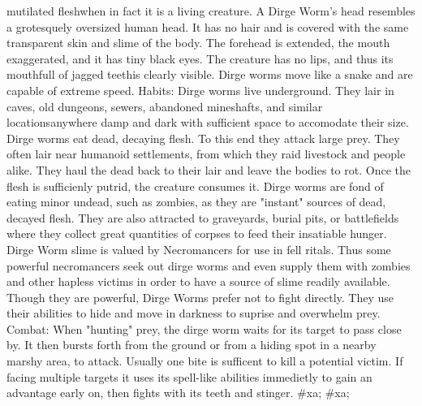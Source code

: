 \documentclass[twoside]{book}
\begin{document}
\begin{multicols}{2}
{           mutilated fleshwhen in fact it is a living creature. A
           Dirge Worm's head resembles a grotesquely oversized human
           head. It has no hair and is covered with the same transparent
           skin and slime of the body. The forehead is extended, the
           mouth exaggerated, and it has tiny black eyes. The creature
           has no lips, and thus its mouthfull of jagged
           teethis clearly visible. Dirge worms move like a snake
           and are capable of extreme speed. Habits: Dirge worms live
           underground. They lair in caves, old dungeons, sewers,
           abandoned mineshafts, and similar locationsanywhere
           damp and dark with sufficient space to accomodate their size.
           Dirge worms eat dead, decaying flesh. To this end they attack
           large prey. They often lair near humanoid settlements, from
           which they raid livestock and people alike. They haul the dead
           back to their lair and leave the bodies to rot. Once the flesh
           is sufficienly putrid, the creature consumes it. Dirge worms
           are fond of eating minor undead, such as zombies, as they are
           "instant" sources of dead, decayed flesh. They are also
           attracted to graveyards, burial pits, or battlefields where
           they collect great quantities of corpses to feed their
           insatiable hunger. Dirge Worm slime is valued by Necromancers
           for use in fell ritals. Thus some powerful necromancers seek
           out dirge worms and even supply them with zombies and other
           hapless victims in order to have a source of slime readily
           available. Though they are powerful, Dirge Worms prefer not to
           fight directly. They use their abilities to hide and move in
           darkness to suprise and overwhelm prey. Combat: When "hunting"
           prey, the dirge worm waits for its target to pass close by. It
           then bursts forth from the ground or from a hiding spot in a
           nearby marshy area, to attack. Usually one bite is sufficent
           to kill a potential victim. If facing multiple targets it uses
           its spell-like abilities immedietly to gain an advantage early
           on, then fights with its teeth and stinger. }\vspace{1ex}
    \hspace{-2ex}
\#xa;
\#xa;
\end{multicols}
\end{document}

